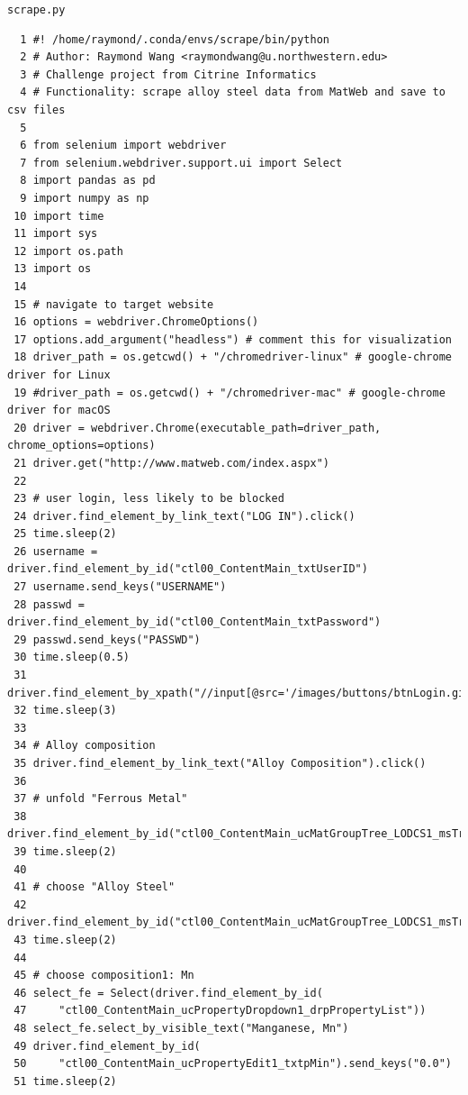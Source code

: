 \documentclass[10pt,aps,prb,amsmath,amssymb,twocolumn,letterpaper,nobalancelastpage,final,citeautoscript,floatfix,raggedbottom,superscriptaddress]{revtex4-1}
\begin{document}
\noindent \hypertarget{scrape}{\texttt{\Large{scrape.py}}}
\begin{lstlisting}
  1 #! /home/raymond/.conda/envs/scrape/bin/python
  2 # Author: Raymond Wang <raymondwang@u.northwestern.edu>
  3 # Challenge project from Citrine Informatics
  4 # Functionality: scrape alloy steel data from MatWeb and save to csv files
  5 
  6 from selenium import webdriver
  7 from selenium.webdriver.support.ui import Select
  8 import pandas as pd
  9 import numpy as np
 10 import time
 11 import sys
 12 import os.path
 13 import os
 14 
 15 # navigate to target website
 16 options = webdriver.ChromeOptions()
 17 options.add_argument("headless") # comment this for visualization
 18 driver_path = os.getcwd() + "/chromedriver-linux" # google-chrome driver for Linux
 19 #driver_path = os.getcwd() + "/chromedriver-mac" # google-chrome driver for macOS
 20 driver = webdriver.Chrome(executable_path=driver_path, chrome_options=options)
 21 driver.get("http://www.matweb.com/index.aspx")
 22 
 23 # user login, less likely to be blocked
 24 driver.find_element_by_link_text("LOG IN").click()
 25 time.sleep(2)
 26 username = driver.find_element_by_id("ctl00_ContentMain_txtUserID")
 27 username.send_keys("USERNAME")
 28 passwd =  driver.find_element_by_id("ctl00_ContentMain_txtPassword")
 29 passwd.send_keys("PASSWD")
 30 time.sleep(0.5)
 31 driver.find_element_by_xpath("//input[@src='/images/buttons/btnLogin.gif']").click()
 32 time.sleep(3)
 33 
 34 # Alloy composition
 35 driver.find_element_by_link_text("Alloy Composition").click()
 36 
 37 # unfold "Ferrous Metal"
 38 driver.find_element_by_id("ctl00_ContentMain_ucMatGroupTree_LODCS1_msTreeViewn1").click()
 39 time.sleep(2)
 40 
 41 # choose "Alloy Steel"
 42 driver.find_element_by_id("ctl00_ContentMain_ucMatGroupTree_LODCS1_msTreeViewt6").click()
 43 time.sleep(2)
 44 
 45 # choose composition1: Mn
 46 select_fe = Select(driver.find_element_by_id(
 47     "ctl00_ContentMain_ucPropertyDropdown1_drpPropertyList"))
 48 select_fe.select_by_visible_text("Manganese, Mn")
 49 driver.find_element_by_id(
 50     "ctl00_ContentMain_ucPropertyEdit1_txtpMin").send_keys("0.0")
 51 time.sleep(2)
\end{lstlisting}
\clearpage
\end{document}
